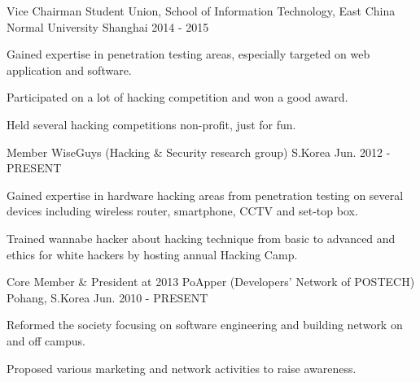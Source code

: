 


\begin{cventries}


\cventry
{Vice Chairman} %
{Student Union, School of Information Technology, East China Normal University} %
{Shanghai} %
{2014 - 2015} %
{ %
\begin{cvitems}
\item {Gained expertise in penetration testing areas, especially targeted on web application and software.}
\item {Participated on a lot of hacking competition and won a good award.}
\item {Held several hacking competitions non-profit, just for fun.}
\end{cvitems}
}


\cventry
{Member} %
{WiseGuys (Hacking \& Security research group)} %
{S.Korea} %
{Jun. 2012 - PRESENT} %
{ %
\begin{cvitems}
\item {Gained expertise in hardware hacking areas from penetration testing on several devices including wireless router, smartphone, CCTV and set-top box.}
\item {Trained wannabe hacker about hacking technique from basic to advanced and ethics for white hackers by hosting annual Hacking Camp.}
\end{cvitems}
}


\cventry
{Core Member \& President at 2013} %
{PoApper (Developers' Network of POSTECH)} %
{Pohang, S.Korea} %
{Jun. 2010 - PRESENT} %
{ %
\begin{cvitems}
\item {Reformed the society focusing on software engineering and building network on and off campus.}
\item {Proposed various marketing and network activities to raise awareness.}
\end{cvitems}
}


\end{cventries}
